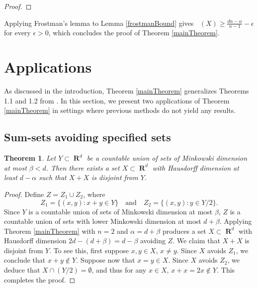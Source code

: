 \documentclass[dvipsnames,letterpaper,12pt]{article}
\numberwithin{equation}{section}
\theoremstyle{plain}
\newtheorem{theorem}{Theorem}
\theoremstyle{remark}
\DeclareMathOperator{\hausdim}{\dim_{\mathbf{H}}}
\DeclareMathOperator{\RR}{\mathbf{R}}
\begin{document}
\begin{proof}
\end{proof}

Applying Frostman's lemma to Lemma \ref{frostmanBound} gives $\hausdim(X) \geq \frac{dn - \alpha}{n - 1} - \epsilon$ for every $\epsilon>0$, which concludes the proof of Theorem \ref{mainTheorem}.









\section{Applications}\label{applications}

As discussed in the introduction, Theorem \ref{mainTheorem} generalizes Theorems 1.1 and 1.2 from \cite{MalabikaRob}. In this section, we present two applications of Theorem \ref{mainTheorem} in settings where previous methods do not yield any results.

\subsection{Sum-sets avoiding specified sets}

\begin{theorem} \label{sumset-application} 
	Let $Y \subset \RR^d$ be a countable union of sets of Minkowski dimension at most $\beta < d$. Then there exists a set $X \subset \RR^d$ with Hausdorff dimension at least $d - \alpha$ such that $X + X$ is disjoint from $Y$.
\end{theorem}
\begin{proof}
	Define $Z = Z_1 \cup Z_2$, where
	\[ Z_1 = \{ (x,y) \colon x + y \in Y \} \quad \text{and} \quad Z_2 = \{ (x,y) \colon y \in Y/2 \}. \]
	Since $Y$ is a countable union of sets of Minkowski dimension at most $\beta$, $Z$ is a countable union of sets with lower Minkowski dimension at most $d + \beta$. Applying Theorem \ref{mainTheorem} with $n = 2$ and $\alpha = d + \beta$ produces a set $X \subset \RR^d$ with Hausdorff dimension $2d  - (d + \beta) = d - \beta$ avoiding $Z$. We claim that $X+ X$ is disjoint from $Y$. To see this, first suppose $x, y \in X$, $x \ne y$. Since $X$ avoids $Z_1$, we conclude that $x + y \not \in Y$. Suppose now that $x = y \in X$. Since $X$ avoids $Z_2$, we deduce that $X \cap (Y/2) = \emptyset$, and thus for any $x \in X$, $x + x = 2x \not \in Y$. This completes the proof. 
\end{proof}
\end{document}
